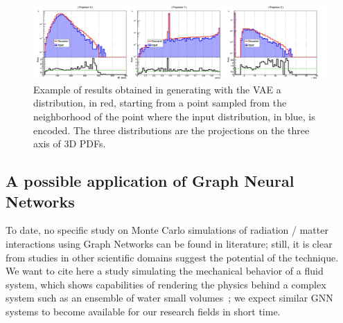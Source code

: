 
\begin{figure}[!bht]
\centering
\includegraphics [width=\textwidth]{images/generated}
\caption{Example of results obtained in generating with the VAE a distribution, in red, starting from a point sampled from the neighborhood of the point where the input distribution, in blue, is encoded. The three distributions are the projections on the three axis of 3D PDFs.}
\label{fig:out}
\end{figure}



\subsection{A possible application of Graph Neural Networks}
To date, no specific study on Monte Carlo simulations of radiation / matter interactions using Graph Networks can be found in literature; still, it is clear from studies in other scientific domains suggest the potential of the technique. 
We want to cite here a study simulating the mechanical behavior of a fluid system, which shows capabilities of rendering the physics behind a complex system such as an ensemble of water small volumes~\cite{Sanchez-Gonzalez2020}; we expect similar GNN systems to become available for our research fields in short time.

